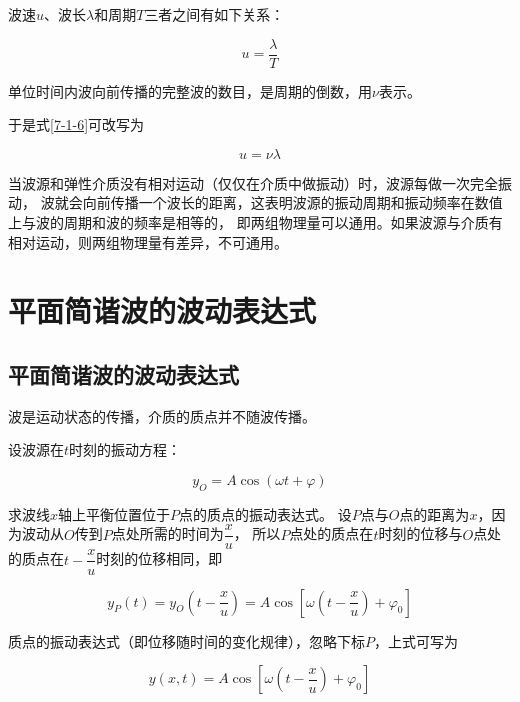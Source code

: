 \documentclass[
	12pt, %
	a4paper, %
]{myLegrandOrangeBook}
\begin{document}
    波速\(u \)、波长\(\lambda\)和周期\(T \)三者之间有如下关系：

    \begin{equation}
        u=\frac{\lambda}{T}
        \label{7-1-6}
    \end{equation}

    \begin{definition}[频率]
        单位时间内波向前传播的完整波的数目，是周期的倒数，用\(\nu\)表示。
    \end{definition}

    于是式\ref{7-1-6}可改写为

    \begin{equation}
        u=\nu \lambda
    \end{equation}

    当波源和弹性介质没有相对运动（仅仅在介质中做振动）时，波源每做一次完全振动，
    波就会向前传播一个波长的距离，这表明波源的振动周期和振动频率在数值上与波的周期和波的频率是相等的，
    即两组物理量可以通用。如果波源与介质有相对运动，则两组物理量有差异，不可通用。

\section{平面简谐波的波动表达式}

\subsection{平面简谐波的波动表达式}

    波是运动状态的传播，介质的质点并不随波传播。

    设波源在\(t\)时刻的振动方程：

    $$
        y_O=A \cos (\omega t+\varphi)
    $$

    求波线\(x \)轴上平衡位置位于\(P \)点的质点的振动表达式。
    设\(P \)点与\(O \)点的距离为\(x \)，因为波动从\(O \)传到\(P \)点处所需的时间为\(\dfrac{x }{u }\)，
    所以\(P \)点处的质点在\(t\)时刻的位移与\(O \)点处的质点在\(t - \dfrac{x }{u }\)时刻的位移相同，即

    $$
        y_P(t)=y_O\left(t-\frac{x}{u}\right)=A \cos \left[\omega\left(t-\frac{x}{u}\right)+\varphi_0\right]
    $$

    质点的振动表达式（即位移随时间的变化规律），忽略下标\(P \)，上式可写为

    \begin{equation}
        y(x, t)=A \cos \left[\omega\left(t-\frac{x}{u}\right)+\varphi_0\right]
        \label{7-2-1}
    \end{equation}
\end{document}
